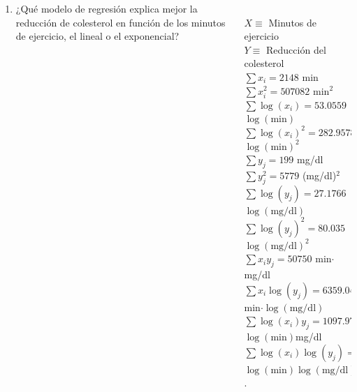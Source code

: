 \documentclass[aspectratio=149,10pt,t]{beamer}
\begin{document}
\begin{frame}
	\begin{columns}
		\begin{column}[T]{0.6\textwidth}
			\begin{enumerate}
				\item ¿Qué modelo de regresión explica mejor la reducción de colesterol en función de los minutos de ejercicio, el lineal o el exponencial?
			\end{enumerate}
		\end{column}
		\begin{column}[T]{0.4\textwidth}
			\\
			$X\equiv$ Minutos de ejercicio\\
			$Y\equiv$ Reducción del colesterol\\
			$\sum x_i=2148$ min\\
			$\sum x_i^2=507082$ min$^2$\\
	 	 	$\sum \log(x_i)=53.0559$ $\log(\mbox{min})$\\
			$\sum \log(x_i)^2=282.9578$ $\log(\mbox{min})^2$\\
	 	 	$\sum y_j=199$ mg/dl\\
			$\sum y_j^2=5779$ (mg/dl)$^2$\\
	 	 	$\sum \log(y_j)=27.1766$ $\log(\mbox{mg/dl})$\\
			$\sum \log(y_j)^2=80.035$ $\log(\mbox{mg/dl})^2$\\
	 	 	$\sum x_iy_j=50750$ min$\cdot$mg/dl\\
			$\sum x_i\log(y_j)=6359.0468$ min$\cdot\log(\mbox{mg/dl})$\\
			$\sum \log(x_i)y_j=1097.978$ $\log(\mbox{min})$mg/dl\\
			$\sum \log(x_i)\log(y_j)=147.0682$ $\log(\mbox{min})\log(\mbox{mg/dl})$.
		\end{column}
	\end{columns}
\end{frame}
\end{document}
